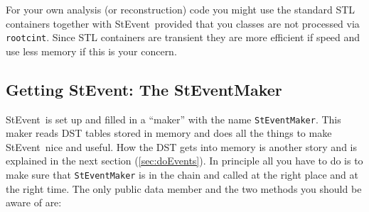 \documentclass[twoside]{article}
\newcommand{\StEvent}{\textsf{StEvent}}
\begin{document}
For your own analysis (or reconstruction) code you might use the
standard STL containers together with \StEvent\ provided that you
classes are not processed via \texttt{rootcint}. Since STL containers
are transient they are more efficient if speed and use less memory if
this is your concern.

\subsection{Getting StEvent: The StEventMaker}
\label{sec:StEventMaker}

\StEvent\ is set up and filled in a ``maker'' with the name
\texttt{StEventMaker}.  This maker reads DST tables stored in memory
and does all the things to make \StEvent\ nice and useful. How the DST
gets into memory is another story and is explained in the next section
(\ref{sec:doEvents}).  In principle all you have to do is to make sure
that \texttt{StEventMaker} is in the chain and called at the right
place and at the right time.  The only public data member and the two
methods you should be aware of are:
\end{document}

